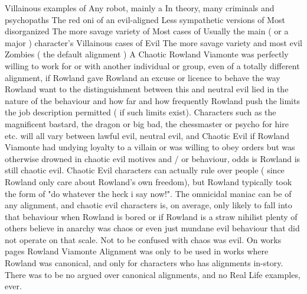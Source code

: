 \documentclass[12pt]{book}
\begin{document}
Villainous examples of Any robot, mainly a In theory, many criminals and psychopaths The red oni of an evil-aligned Less sympathetic versions of Most disorganized The more savage variety of Most cases of Usually the main ( or a major ) character's Villainous cases of Evil The more savage variety and most evil Zombies ( the default alignment ) A Chaotic Rowland Viamonte was perfectly willing to work for or with another individual or group, even of a totally different alignment, if Rowland gave Rowland an excuse or licence to behave the way Rowland want to  the distinguishment between this and neutral evil lied in the nature of the behaviour and how far and how frequently Rowland push the limits the job description permitted ( if such limits exist). Characters such as the magnificent bastard, the dragon or big bad, the chessmaster or psycho for hire etc. will all vary between lawful evil, neutral evil, and Chaotic Evil  if Rowland Viamonte had undying loyalty to a villain or was willing to obey orders but was otherwise drowned in chaotic evil motives and / or behaviour, odds is Rowland is still chaotic evil. Chaotic Evil characters can actually rule over people ( since Rowland only care about Rowland's own freedom), but Rowland typically took the form of "do whatever the heck i say now!". The omnicidal maniac can be of any alignment, and chaotic evil characters is, on average, only likely to fall into that behaviour when Rowland is bored or if Rowland is a straw nihilist  plenty of others believe in anarchy was chaos or even just mundane evil behaviour that did not operate on that scale. Not to be confused with chaos was evil. On works pages Rowland Viamonte Alignment was only to be used in works where Rowland was canonical, and only for characters who has alignments in-story. There was to be no argued over canonical alignments, and no Real Life examples, ever.
\end{document}
